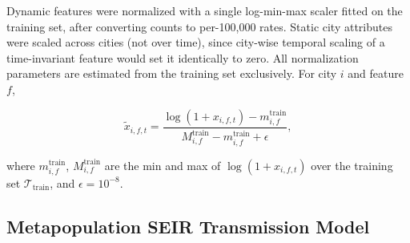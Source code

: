 \documentclass[10pt,letterpaper]{article}
\begin{document}
	
	Dynamic features were normalized with a single log-min-max scaler fitted on the training set, after converting counts to per-100,000 rates. Static city attributes
	were scaled across cities (not over time), since city-wise temporal scaling of a
	time-invariant feature would set it identically to zero. All normalization
	parameters are estimated from the training set exclusively.
	For city $i$ and feature $f$,
	
	\begin{equation*}
		\tilde{x}_{i,f,t} = \frac{\log(1 + x_{i,f,t}) - m_{i,f}^{\mathrm{train}}}
		{M_{i,f}^{\mathrm{train}} - m_{i,f}^{\mathrm{train}} + \epsilon},
	\end{equation*}
	
	\noindent where $m_{i,f}^{\mathrm{train}}$, $M_{i,f}^{\mathrm{train}}$ are the min
	and max of $\log(1 + x_{i,f,t})$ over the training set $\mathcal{T}_{\mathrm{train}}$,
	and $\epsilon = 10^{-8}$. 
	\subsection*{Metapopulation SEIR Transmission Model}
	
\end{document}
